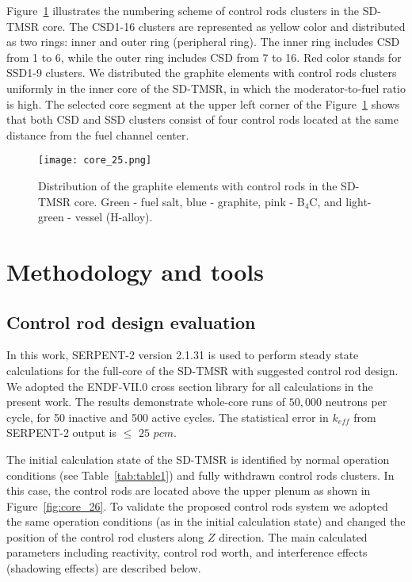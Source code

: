 Figure~\ref{fig:core_25} illustrates the numbering scheme of control rods 
clusters in the SD-TMSR core.
The CSD1-16 clusters are represented as yellow color and distributed as two rings: inner and outer ring (peripheral ring). The inner ring includes CSD from 1 to 6, while the outer ring includes CSD from 7 to 16. Red color stands for SSD1-9 clusters.
We distributed the graphite elements with control rods clusters uniformly in 
the inner core of the SD-TMSR, in which the moderator-to-fuel ratio is high.
The selected core segment at the upper left corner of the 
Figure~\ref{fig:core_25} shows that both CSD and SSD clusters consist of four 
control rods located at the same distance from the fuel channel center.
\begin{figure}[t!]  %
	\centering
	\hspace{+0.65in}
	\texttt{[image: core\_25.png]}
	\caption{Distribution of the graphite elements with control rods in the SD-TMSR core. Green - fuel salt, blue - graphite, pink - B$_4$C, and light-green - vessel (H-alloy).}
	\label{fig:core_25}
\end{figure}

\section{Methodology and tools} \label{Methodology-and-tools}
\subsection{Control rod design evaluation}
In this work, SERPENT-2 version 2.1.31 \cite{leppanen2014serpent} is used to 
perform steady state calculations for the full-core of the SD-TMSR with 
suggested control rod design. We adopted the ENDF-VII.0 cross section library 
for all calculations in the present work. The results demonstrate whole-core 
runs of $50,000$ neutrons per cycle, for 50 inactive and 500 active cycles. The 
statistical error in $k_{eff}$ from SERPENT-2 output is $\leq$ $25$ 
$pcm$.

The initial calculation state of the SD-TMSR is identified by normal operation 
conditions (see Table~\ref{tab:table1}) and fully withdrawn control rods 
clusters. In this case, the control rods are located above the upper plenum as 
shown in Figure~\ref{fig:core_26}. To validate the proposed control rods 
system we adopted the same operation conditions (as in the initial calculation 
state) and changed the position of the control rod clusters along $Z$ 
direction. The main calculated parameters including reactivity, control rod 
worth, and interference effects (shadowing effects) are described below.


